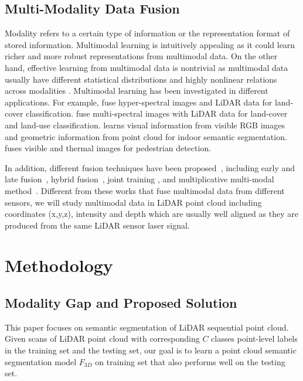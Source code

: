 \documentclass[preprint,review,3p]{elsarticle}
\begin{document}
\subsection{Multi-Modality Data Fusion}
Modality refers to a certain type of information or the representation format of stored information. Multimodal learning is intuitively appealing as it could learn richer and more robust representations from multimodal data.
On the other hand, effective learning from multimodal data is nontrivial as multimodal data usually have different statistical distributions and highly nonlinear relations across modalities \cite{liu2018learn}.
Multimodal learning has been investigated in different applications. For example, \cite{liao2014generalized,ghamisi2015land,rasti2017hyperspectral,rasti2017fusion,hong2020more} fuse hyper-spectral images and LiDAR data for land-cover classification. \cite{dechesne2017semantic,sun2018developing,hong2020more} fuse multi-spectral images with LiDAR data for land-cover and land-use classification. \cite{qi20173d} learns visual information from visible RGB images and geometric information from point cloud for indoor semantic segmentation. \cite{guan2019fusion,cao2019box} fuses visible and thermal images for pedestrian detection.

In addition, different fusion techniques have been proposed~\cite{atrey2010multimodal,liu2018learn}, including early and late fusion~\cite{snoek2005early,gunes2005affect}, hybrid fusion~\cite{bendjebbour2001multisensor,xu2006fusion}, joint training \cite{ngiam2011multimodal,sun2019not}, and multiplicative multi-modal method~\cite{liu2018learn}. Different from these works that fuse multimodal data from different sensors, we will study multimodal data in LiDAR point cloud including coordinates (x,y,z), intensity and depth which are usually well aligned as they are produced from the same LiDAR sensor laser signal.

\section{Methodology}\label{Sec.methodology}

\subsection{Modality Gap and Proposed Solution}\label{Sec.problem_definition}
This paper focuses on semantic segmentation of LiDAR sequential point cloud. 
Given scans of LiDAR  point cloud with corresponding $C$ classes point-level labels in the training set and the testing set, our goal is to learn a point cloud semantic segmentation model $F_{3D}$ on training set that also performs well on the testing set. 
\end{document}
